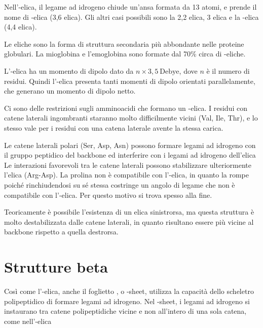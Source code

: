 Nell'\alpha-elica, il legame ad idrogeno chiude un'ansa formata da 13
atomi, e prende il nome di \alpha-elica (3,6 elica). Gli altri
casi possibili sono la 2,2 elica, 3 elica e la \pi-elica
(4,4 elica).

Le eliche sono la forma di struttura secondaria più abbondante nelle
proteine globulari.
La mioglobina e l'emoglobina sono formate dal 70\% circa di
\alpha-eliche.

L'\alpha-elica ha un momento di dipolo dato da
\(n \times 3,5 \: \text{Debye}\), dove \(n\) è il numero di residui.
Quindi l'\alpha-elica presenta tanti momenti di dipolo orientati
parallelamente, che generano un momento di dipolo netto.


Ci sono delle restrizioni sugli amminoacidi che formano un \alpha-elica.
I residui con catene laterali ingombranti staranno molto difficilmente
vicini (Val, Ile, Thr), e lo stesso vale per i residui con una catena
laterale avente la stessa carica.

Le catene laterali polari (Ser, Asp, Asn) possono formare legami ad
idrogeno con il gruppo peptidico del backbone ed interferire con i
legami ad idrogeno dell'elica
Le interazioni favorevoli tra le catene laterali possono stabilizzare
ulteriormente l'elica (Arg-Asp).
La prolina non è compatibile con l'\alpha-elica, in quanto la rompe
poiché rinchiudendosi su sé stessa costringe un angolo di legame che non
è compatibile con l'\alpha-elica. Per questo motivo si trova spesso alla
fine.

Teoricamente è possibile l'esistenza di un elica sinistrorsa, ma questa
struttura è molto destabilizzata dalle catene laterali, in quanto
risultano essere più vicine al backbone rispetto a quella destrorsa.


\clearpage

\section{Strutture beta}

Così come l'\alpha-elica, anche il foglietto \beta, o \beta-sheet,
utilizza la capacità dello scheletro polipeptidico di formare legami ad
idrogeno. Nel \beta-sheet, i legami ad idrogeno si instaurano tra catene
polipeptidiche vicine e non all'intero di una sola catena, come
nell'\alpha-elica


